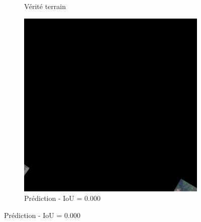 \begin{figure}[H]
\begin{subfigure}{0.32\textwidth}
    \caption{Vérité terrain}
\end{subfigure}
\hfill
\begin{subfigure}{0.32\textwidth}
    \includegraphics[width=\textwidth]{02-main//figures/ch4/kfold_ensembles/upernet_tu-efficientnetv2_rw_s.ra2_in1k/worst_cases/worst_4_iou0.000_25001112_tile_9_1_991a94_overlay_pred.png}
    \caption{Prédiction - IoU = 0.000}
\end{subfigure}

\vspace{0.35cm}


\end{figure}
